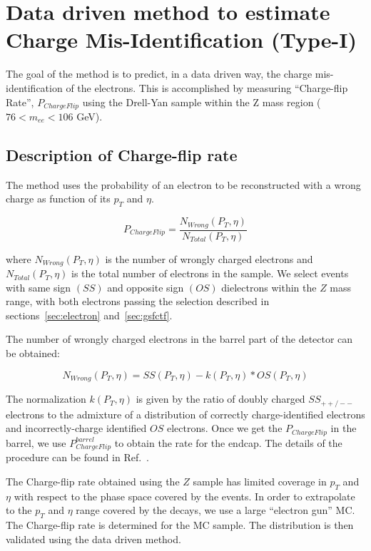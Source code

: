 \section{Data driven method to estimate Charge Mis-Identification (Type-I)}
\label{sec:chargemisid}

The goal of the method is to predict, in a data driven way, the charge 
mis-identification of the electrons. This is accomplished
by measuring ``Charge-flip Rate'', $P_{ChargeFlip}$ using the Drell-Yan sample within the Z mass region
($76 < m_{ee} < 106 $ GeV). 

\subsection{Description of Charge-flip rate}

The method uses the probability of an electron to be reconstructed 
with a wrong charge as function of its $p_T$ and $\eta$.

\begin{equation}
P_{ChargeFlip} = \frac{N_{Wrong}(P_T, \eta)}{N_{Total}(P_T, \eta)}
\end{equation}

where $N_{Wrong}(P_T, \eta)$ is the number of wrongly charged electrons  and $N_{Total}(P_T, \eta)$ is 
the total number of electrons in the sample. We select events with same sign $(SS)$ 
and opposite sign $(OS)$ dielectrons within the $Z$ mass range, with both electrons passing the 
selection described in sections~\ref{sec:electron} and~\ref{sec:gsfctf}. 

The number of wrongly charged electrons in the barrel part of the detector can be obtained:

\begin{equation}
  N_{Wrong}(P_T, \eta) = SS(P_T, \eta) - k(P_T, \eta) * OS(P_T, \eta) 
\end{equation}

The normalization $k(P_T, \eta)$ is given by the ratio of doubly charged $SS_{++/--}$ electrons to the 
admixture of a distribution of correctly charge-identified electrons and incorrectly-charge 
identified $OS$ electrons. Once we get the $P_{ChargeFlip}$ in the barrel, we use 
$P^{barrel}_{ChargeFlip}$ to obtain the rate for the endcap. The details of the procedure can be found
in Ref.~\cite{chargefake}.


The Charge-flip rate obtained using the $Z$ sample has limited coverage in $p_T$ and $\eta$ with respect
to the phase space covered by the \ttbar events. In order to extrapolate to the $p_T$ and $\eta$ 
range covered by the \ttbar decays, we use a large ``electron gun'' MC. The Charge-flip rate is determined 
for the MC sample. The distribution is then validated using the data driven method.

